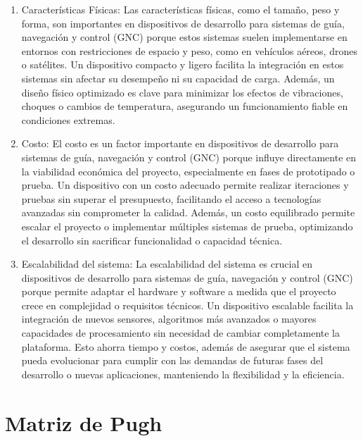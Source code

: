 \begin{enumerate}
    \item Características Físicas: Las características físicas, como el tamaño, peso y forma, son importantes en dispositivos de desarrollo para sistemas de guía, navegación y control (GNC) porque estos sistemas suelen implementarse en entornos con restricciones de espacio y peso, como en vehículos aéreos, drones o satélites. Un dispositivo compacto y ligero facilita la integración en estos sistemas sin afectar su desempeño ni su capacidad de carga. Además, un diseño físico optimizado es clave para minimizar los efectos de vibraciones, choques o cambios de temperatura, asegurando un funcionamiento fiable en condiciones extremas.

    \item Costo: El costo es un factor importante en dispositivos de desarrollo para sistemas de guía, navegación y control (GNC) porque influye directamente en la viabilidad económica del proyecto, especialmente en fases de prototipado o prueba. Un dispositivo con un costo adecuado permite realizar iteraciones y pruebas sin superar el presupuesto, facilitando el acceso a tecnologías avanzadas sin comprometer la calidad. Además, un costo equilibrado permite escalar el proyecto o implementar múltiples sistemas de prueba, optimizando el desarrollo sin sacrificar funcionalidad o capacidad técnica.

    \item Escalabilidad del sistema: 
    La escalabilidad del sistema es crucial en dispositivos de desarrollo para sistemas de guía, navegación y control (GNC) porque permite adaptar el hardware y software a medida que el proyecto crece en complejidad o requisitos técnicos. Un dispositivo escalable facilita la integración de nuevos sensores, algoritmos más avanzados o mayores capacidades de procesamiento sin necesidad de cambiar completamente la plataforma. Esto ahorra tiempo y costos, además de asegurar que el sistema pueda evolucionar para cumplir con las demandas de futuras fases del desarrollo o nuevas aplicaciones, manteniendo la flexibilidad y la eficiencia.

\end{enumerate}
\newpage

\section{Matriz de Pugh}

